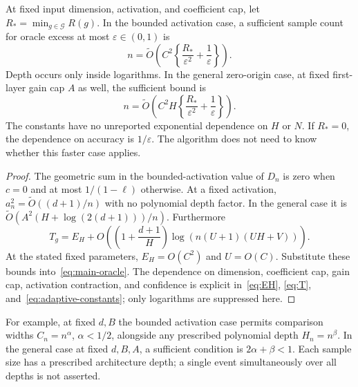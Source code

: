 \begin{corollary}
\label{cor:polynomials}
At fixed input dimension, activation, and coefficient cap, let $R_*=\min_{g\in\mathcal G}R(g)$. In the bounded activation case, a sufficient sample count for oracle excess at most $\varepsilon\in(0,1)$ is
\begin{equation}
 n=\widetilde O\left(C^2\left\{\frac{R_*}{\varepsilon^2}+\frac1\varepsilon\right\}\right).
 \label{eq:bounded-budget}
\end{equation}
Depth occurs only inside logarithms. In the general zero-origin case, at fixed first-layer gain cap $A$ as well, the sufficient bound is
\begin{equation}
 n=\widetilde O\left(C^2H\left\{\frac{R_*}{\varepsilon^2}+\frac1\varepsilon\right\}\right).
 \label{eq:general-budget}
\end{equation}
The constants have no unreported exponential dependence on $H$ or $N$. If $R_*=0$, the dependence on accuracy is $1/\varepsilon$. The algorithm does not need to know whether this faster case applies.
\end{corollary}
\begin{proof}
The geometric sum in the bounded-activation value of $D_n$ is zero when $c=0$ and at most $1/(1-\ell)$ otherwise. At a fixed activation, $a_n^2=\widetilde O((d+1)/n)$ with no polynomial depth factor. In the general case it is $\widetilde O(A^2(H+\log(2(d+1)))/n)$. Furthermore
\[
 T_g=E_H+O\left(\left(1+\frac{d+1}{H}\right)\log(n(U+1)(UH+V))\right).
\]
At the stated fixed parameters, $E_H=O(C^2)$ and $U=O(C)$. Substitute these bounds into~\eqref{eq:main-oracle}. The dependence on dimension, coefficient cap, gain cap, activation contraction, and confidence is explicit in~\eqref{eq:EH}, \eqref{eq:T}, and~\eqref{eq:adaptive-constants}; only logarithms are suppressed here.
\end{proof}

For example, at fixed $d,B$ the bounded activation case permits comparison widths $C_n=n^\alpha$, $\alpha<1/2$, alongside any prescribed polynomial depth $H_n=n^\beta$. In the general case at fixed $d,B,A$, a sufficient condition is $2\alpha+\beta<1$. Each sample size has a prescribed architecture depth; a single event simultaneously over all depths is not asserted.
